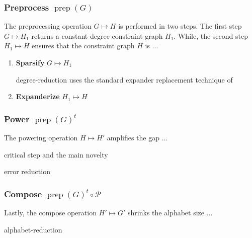 \documentclass{article}
\newcommand{\prep}{{\operatorname{prep}}}
\begin{document}
\subsubsection*{Preprocess $\prep(G)$}

The preprocessing operation $G \mapsto H$ is performed in two steps.
The first step $G \mapsto H_1$ returns a constant-degree constraint graph $H_1$.
While, the second step $H_1 \mapsto H$ ensures that the constraint graph $H$
is ... 

\begin{enumerate}
\item \textbf{Sparsify} $G \mapsto H_1$

degree-reduction uses the standard expander replacement technique of \cite{papadimitriou1991optimization}

\item \textbf{Expanderize} $H_1 \mapsto H$

\end{enumerate}

\subsubsection*{Power $\prep(G)^t$}

The powering operation $H \mapsto H'$ amplifies the gap ...

critical step and the main novelty

error reduction

\subsubsection*{Compose $\prep(G)^t \circ \mathcal{P}$}

Lastly, the compose operation $H' \mapsto G'$ shrinks the alphabet size ...

alphabet-reduction



\end{document}
